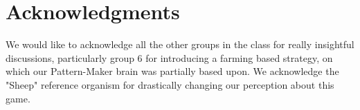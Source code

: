 \section{Acknowledgments}
\label{sec:ack}

We would like to acknowledge all the other groups in the class for really insightful 
discussions, particularly group 6 for introducing a farming based strategy, on which 
our Pattern-Maker brain was partially based upon. We acknowledge the "Sheep" reference 
organism for drastically changing our perception about this game.
